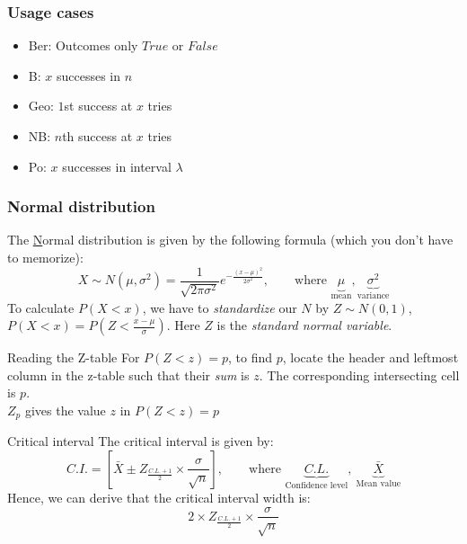 \documentclass{article}
\begin{document}
\subsubsection{Usage cases}
\vspace{-0.2cm}
\begin{itemize}
    \item Ber: Outcomes only $True$ or $False$
    \item B: $x$ successes in $n$
    \item Geo: $1$st success at $x$ tries
    \item NB: $n$th success at $x$ tries
    \item Po: $x$ successes in interval $\lambda$
\end{itemize}

\subsubsection{Normal distribution}
The \underline{N}ormal distribution is given by the following formula (which you don't have to memorize):
\[X\sim N(\mu, \sigma^2)=\frac{1}{\sqrt{2\pi\sigma^2}} e^{-\frac{(x-\mu)^2}{2\sigma^2}},\quad\quad\text{where }\underbrace{\mu}_{\text{mean}},\underbrace{\sigma^2}_{\text{variance}}\]
To calculate $P(X<x)$, we have to \emph{standardize} our $N$ by $Z\sim N(0, 1)$, $P(X<x)=P(Z<\frac{x-\mu}{\sigma})$. Here $Z$ is the \emph{standard normal variable}.

\begin{knBox}[]{Reading the Z-table}
    For $P(Z<z)=p$, to find $p$, locate the header and leftmost column in the z-table such that their \emph{sum} is $z$. The corresponding intersecting cell is $p$.\\
    $Z_p$ gives the value $z$ in $P(Z<z)=p$
\end{knBox}
\begin{definition}[]{Critical interval}
    The critical interval is given by:
    \[C.I.=[\bar{X}\pm Z_{\frac{C.L.+1}{2}}\times\frac{\sigma}{\sqrt{n}}],\quad\quad\text{where }\underbrace{C.L.}_{\text{Confidence level}},\ \underbrace{\bar{X}}_{\text{Mean value}}\]
    Hence, we can derive that the critical interval width is:
    \[2\times Z_{\frac{C.L.+1}{2}}\times\frac{\sigma}{\sqrt{n}}\]
\end{definition}
\end{document}
